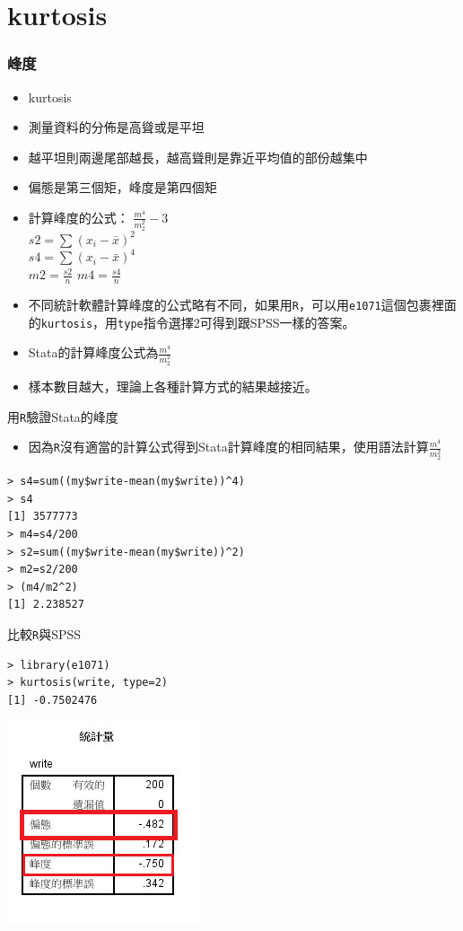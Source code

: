 \documentclass{beamer}
\begin{document}
\section{kurtosis}
\begin{frame}\frametitle{峰度}
\begin{itemize}
\item[\boxtimes] kurtosis
\item[\boxtimes] 測量資料的分佈是高聳或是平坦
\item[\boxtimes] 越平坦則兩邊尾部越長，越高聳則是靠近平均值的部份越集中
\item[\boxtimes] 偏態是第三個矩，峰度是第四個矩
\item[\boxtimes] 計算峰度的公式：
$\frac{m^4}{m^2_{2}}-3$\\
$s2=\sum (x_{i}-\bar{x})^2$\\
$s4=\sum (x_{i}-\bar{x})^4$\\
$m2=\frac{s2}{n}$
$m4=\frac{s4}{n}$\\
\item[\boxtimes] 不同統計軟體計算峰度的公式略有不同，如果用{\tt R}，可以用{\tt e1071}這個包裹裡面的{\tt kurtosis}，用{\tt type}指令選擇2可得到跟SPSS一樣的答案。
\item[\boxtimes] Stata的計算峰度公式為$\frac{m^4}{m^2_{2}}$
\item[\boxtimes] 樣本數目越大，理論上各種計算方式的結果越接近。
\end{itemize}
\end{frame}
\begin{frame}[fragile]{用\texttt{R}驗證Stata的峰度}
\begin{itemize}
\item 因為\texttt{R}沒有適當的計算公式得到Stata計算峰度的相同結果，使用語法計算$\frac{m^4}{m^2_{2}}$
\end{itemize}
\begin{Verbatim}[frame=single,label=\textit{R code}]
> s4=sum((my$write-mean(my$write))^4)
> s4
[1] 3577773
> m4=s4/200
> s2=sum((my$write-mean(my$write))^2)
> m2=s2/200
> (m4/m2^2)
[1] 2.238527
\end{Verbatim}
\end{frame}
\begin{frame}[fragile]{比較\texttt{R}與SPSS}
\begin{Verbatim}[frame=single,label=\textit{R code}]
> library(e1071)
> kurtosis(write, type=2)
[1] -0.7502476
\end{Verbatim}
\centering
\includegraphics[scale=.8]{write_spss.png}
\end{frame}
\end{document}
